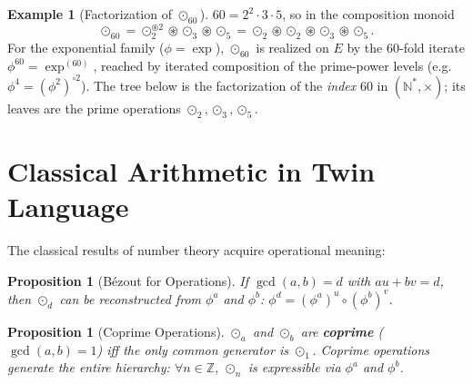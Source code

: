 \documentclass[11pt,twocolumn]{article}
\theoremstyle{plain}
\newtheorem{proposition}[theorem]{Proposition}
\theoremstyle{definition}
\newtheorem{example}[theorem]{Example}
\theoremstyle{remark}
\newcommand{\N}{\mathbb{N}}
\newcommand{\Z}{\mathbb{Z}}
\begin{document}
\begin{example}[Factorization of $\odot_{60}$]
$60 = 2^2 \cdot 3 \cdot 5$, so in the composition monoid
\[
\odot_{60} = \odot_2^{\circledast 2} \circledast \odot_3 \circledast \odot_5 = \odot_2 \circledast \odot_2 \circledast \odot_3 \circledast \odot_5.
\]
For the exponential family ($\phi = \exp$), $\odot_{60}$ is realized on $E$ by the $60$-fold iterate $\phi^{60} = \exp^{(60)}$, reached by iterated composition of the prime-power levels (e.g.\ $\phi^4 = (\phi^2)^{\circ 2}$). The tree below is the factorization of the \emph{index} $60$ in $(\N^*, \times)$; its leaves are the prime operations $\odot_2, \odot_3, \odot_5$.

\begin{center}
\end{center}
\end{example}


\section{Classical Arithmetic in Twin Language}
\label{sec:classical}

The classical results of number theory acquire operational meaning:

\begin{proposition}[B\'ezout for Operations]\label{prop:bezout}
If $\gcd(a,b) = d$ with $au + bv = d$, then $\odot_d$ can be reconstructed from $\phi^a$ and $\phi^b$: $\phi^d = (\phi^a)^u \circ (\phi^b)^v$.
\end{proposition}

\begin{proposition}[Coprime Operations]\label{prop:coprime}
$\odot_a$ and $\odot_b$ are \textbf{coprime} ($\gcd(a,b) = 1$) iff the only common generator is $\odot_1$. Coprime operations generate the entire hierarchy: $\forall n \in \Z$, $\odot_n$ is expressible via $\phi^a$ and $\phi^b$.
\end{proposition}
\end{document}
